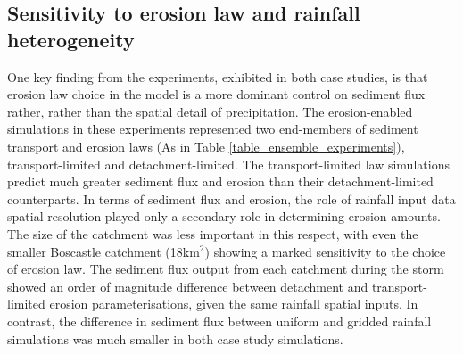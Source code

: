\subsection{Sensitivity to erosion law and rainfall heterogeneity} 
One key finding from the experiments, exhibited in both case studies, is that erosion law choice in the model is a more dominant control on sediment flux rather, rather than the spatial detail of precipitation. The erosion-enabled simulations in these experiments represented two end-members of sediment transport and erosion laws (As in Table \ref{table_ensemble_experiments}), transport-limited and detachment-limited. The transport-limited law simulations predict much greater sediment flux and erosion than their detachment-limited counterparts. In terms of sediment flux and erosion, the role of rainfall input data spatial resolution played only a secondary role in determining erosion amounts. The size of the catchment was less important in this respect, with even the smaller Boscastle catchment (18km\(^2\)) showing a marked sensitivity to the choice of erosion law. The sediment flux output from each catchment during the storm showed an order of magnitude difference between detachment and transport-limited erosion parameterisations, given the same rainfall spatial inputs. In contrast, the difference in sediment flux between uniform and gridded rainfall simulations was much smaller in both case study simulations.

